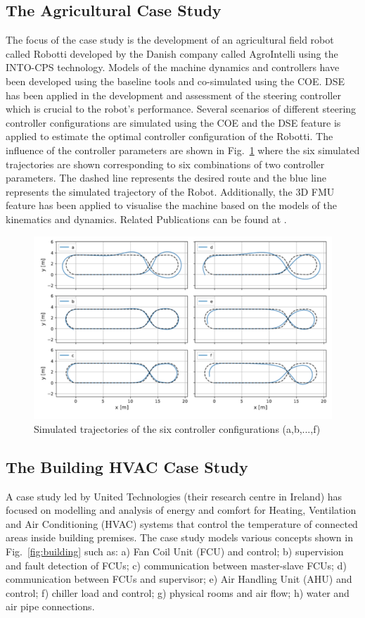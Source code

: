 \subsection{The Agricultural Case Study}

The focus of the case study is the development of an agricultural field robot called Robotti developed by the Danish company called AgroIntelli using the INTO-CPS technology. Models of the machine dynamics and controllers have been developed using the baseline tools and co-simulated using the COE. DSE has been applied in the development and assessment of the steering controller which is crucial to the robot's performance. Several scenarios of different steering controller configurations are simulated using the COE and the DSE feature is applied to estimate the optimal controller configuration of the Robotti. The influence of the controller parameters are shown in Fig.~\ref{fig:agri} where the six simulated trajectories are shown corresponding to six combinations of two controller parameters. The dashed line represents the desired route and the blue line represents the simulated trajectory of the Robot. Additionally, the 3D FMU feature has been applied to visualise the machine based on the models of the kinematics and dynamics. 
Related Publications can be found at \cite{Foldager&17,Foldager&18}. 

\begin{figure}[!ht]
	\centering
		\includegraphics[width=0.9 \textwidth]{./figures/agri}
	\caption{Simulated trajectories of the six controller configurations (a,b,...,f)}
	\label{fig:agri}
\end{figure}

\subsection{The Building HVAC Case Study}
 A case study led by United Technologies (their research centre in Ireland) has focused on modelling and analysis of energy and comfort for Heating, Ventilation and Air Conditioning (HVAC) systems that control the temperature of connected areas inside building premises. The case study models various concepts shown in Fig.~\ref{fig:building} such as: a) Fan Coil Unit (FCU) and control; b) supervision and fault detection of FCUs; c) communication between master-slave FCUs; d) communication between FCUs and supervisor; e) Air Handling Unit (AHU) and control; f) chiller load and control; g) physical rooms and air flow; h) water and air pipe connections.

